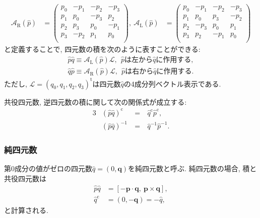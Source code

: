 \begin{align}
 \mathcal{A}_{\mathrm{R}} (\hat{p})&=
   \left(
     \begin{array}{cccc}
       p_{0} & -p_{1} & -p_{2} & -p_{3} \\
       p_{1} &  p_{0} & -p_{3} &  p_{2} \\
       p_{2} &  p_{3} &  p_{0} & -p_{1} \\
       p_{3} & -p_{2} &  p_{1} &  p_{0} \\
     \end{array}
   \right),~
 \mathcal{A}_{\mathrm{L}} (\hat{p})&=
   \left(
     \begin{array}{cccc}
       p_{0} & -p_{1} & -p_{2} & -p_{3} \\
       p_{1} &  p_{0} &  p_{3} & -p_{2} \\
       p_{2} & -p_{3} &  p_{0} &  p_{1} \\
       p_{3} &  p_{2} & -p_{1} &  p_{0} \\
     \end{array}
   \right)
\end{align}
と定義することで, 四元数の積を次のように表すことができる:
\begin{align}
 \hat{p}\hat{q} \equiv \mathcal{A}_{\mathrm{L}} (\hat{p}) \mathcal{L},
 ~~ \hat{p}\mathrm{は左から}\hat{q}\mathrm{に作用する},
 \\
 \hat{q}\hat{p} \equiv \mathcal{A}_{\mathrm{R}} (\hat{p}) \mathcal{L}, 
 ~~ \hat{p}\mathrm{は右から}\hat{q}\mathrm{に作用する}.
\end{align}
ただし, $\mathcal{L} = (q_{0}, q_{1}, q_{2}, q_{3})^{\mathrm{t}}$は四元数$\hat{q}$の4成分列ベクトル表示である.

共役四元数, 逆四元数の積に関して次の関係式が成立する:
\begin{alignat}{3}
 &(\hat{p}\hat{q})^{\mathrm{c}} &~=~& \hat{q}^{\mathrm{c}} \hat{p}^{\mathrm{c}},
 \\
 &(\hat{p}\hat{q})^{-1} &~=~& \hat{q}^{-1} \hat{p}^{-1}.
\end{alignat}

\subsubsection{純四元数}
第0成分の値がゼロの四元数$\hat{q} = (0, \mathbf{q})$を純四元数と呼ぶ.
純四元数の場合, 積と共役四元数は
\begin{align}
 \hat{p} \hat{q} &= [-\mathbf{p} \cdot \mathbf{q},~ \mathbf{p} \times \mathbf{q}],
 \\
 \hat{q}^{\mathrm{c}} &= (0, -\mathbf{q}) = -\hat{q},
\end{align}
と計算される.

